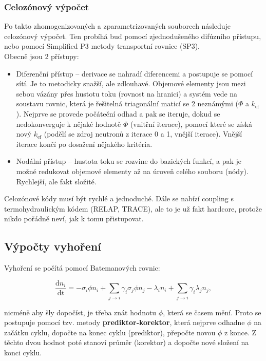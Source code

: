 \subsubsection{Celozónový výpočet}

Po takto zhomogenizovaných a zparametrizovaných souborech následuje celozónový výpočet. Ten probíhá buď pomocí zjednodušeného difúzního přístupu, nebo pomocí Simplified P3 metody transportní rovnice (SP3).\\

Obecně jsou 2 přístupy:

\begin{itemize}
  \item Diferenční přístup -- derivace se nahradí diferencemi a postupuje se pomocí sítí. Je to metodicky snažší, ale zdlouhavé. Objemové elementy jsou mezi sebou vázány přes hustotu toku (rovnost na hranici) a systém vede na soustavu rovnic, která je řešitelná triagonální maticí se 2 neznámými ($\Phi$ a $k_\text{ef}$). Nejprve se provede počáteční odhad a pak se iteruje, dokud se nedokonverguje k nějaké hodnotě $\Phi$ (vnitřní iterace), pomocí které se získá nový $k_\text{ef}$ (podělí se zdroj neutronů z iterace 0 a 1, vnější iterace). Vnější iterace končí po dosažení nějakého kritéria.
  \item Nodální přístup -- hustota toku se rozvine do bazických funkcí, a pak je možné redukovat objemové elementy až na úroveň celého souboru (nódy). Rychlejší, ale fakt složité.
\end{itemize}

Celozónové kódy musí být rychlé a jednoduché. Dále se nabízí coupling s termohydraulickým kódem (RELAP, TRACE), ale to je už fakt hardcore, protože nikdo pořádně neví, jak k tomu přistupovat.

\subsection{Výpočty vyhoření}

Vyhoření se počítá pomocí Batemanových rovnic:

\begin{equation}
  \dfrac{\text{d}n_i}{\text{d}t} = -\sigma_i \phi n_i + \sum_{j \to i} \gamma_i \sigma_j \phi n_j - \lambda_i n_i + \sum_{j \to i} \gamma_i \lambda_j n_j,
\end{equation}

nicméně aby šly dopočíst, je třeba znát hodnotu $\phi$, která se časem mění. Proto se postupuje pomocí tzv. metody \textbf{prediktor-korektor}, která nejprve odhadne $\phi$ na začátku cyklu, dopočte na konec cyklu (prediktor), přepočte novou $\phi$ z konce. Z těchto dvou hodnot poté stanoví průměr (korektor) a dopočte nové složení na konci cyklu.\\

